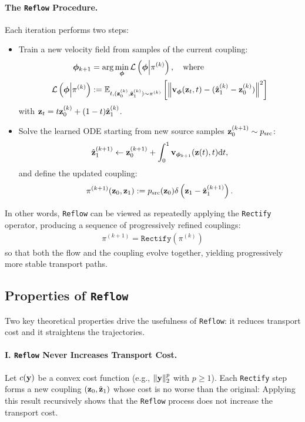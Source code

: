 \paragraph{The \texttt{Reflow} Procedure.}
Each iteration performs two steps:
\begin{itemize} 
    \item {} Train a new velocity field from samples of the current coupling: \begin{align} \bm{\phi}_{k+1} &= \arg\min_{\bm{\phi}} \mathcal{L}\left(\bm{\phi}\Big\vert \pi^{(k)}\right), \quad \text{where} \notag \\ \mathcal{L}\left(\bm{\phi}\Big\vert \pi^{(k)}\right) &:= \mathbb{E}_{t, ({\mathbf{z}}_0^{(k)}, \hat{{\mathbf{z}}}_1^{(k)})\sim \pi^{(k)}} \left[\left\|{\mathbf{v}}_{\bm{\phi}}({\mathbf{z}}_t, t) - (\hat{{\mathbf{z}}}_1^{(k)} - {\mathbf{z}}_0^{(k)})\right\|^2\right] \label{eq:reflow-loss} \end{align} with ${\mathbf{z}}_t = t {\mathbf{z}}_0^{(k)} + (1 - t) \hat{{\mathbf{z}}}_1^{(k)}$. 
    \item {} Solve the learned ODE starting from new source samples ${\mathbf{z}}_0^{(k+1)} \sim p_{\text{src}}$: \[ \hat{{\mathbf{z}}}_1^{(k+1)} \gets {\mathbf{z}}_0^{(k+1)} + \int_0^1 {\mathbf{v}}_{\bm{\phi}_{k+1}}({\mathbf{z}}(t), t) \mathrm{d}t, \] and define the updated coupling: \[ \pi^{(k+1)}({\mathbf{z}}_0, {\mathbf{z}}_1) := p_{\text{src}}({\mathbf{z}}_0) \delta\left({\mathbf{z}}_1 - \hat{{\mathbf{z}}}_1^{(k+1)}\right). \] \end{itemize}
In other words, \texttt{Reflow} can be viewed as repeatedly applying the \texttt{Rectify} operator, producing a sequence of progressively refined couplings:
\begin{align}\label{eq:rectify-op}
    \pi^{(k+1)} = \texttt{Rectify} \left(\pi^{(k)}\right)
\end{align}
so that both the flow and the coupling evolve together, yielding progressively more stable transport paths.



\subsection{Properties of \texttt{Reflow}}\label{subsec:reflow-properties}

Two key theoretical properties drive the usefulness of \texttt{Reflow}: it reduces transport cost and it straightens the trajectories.

\paragraph{I. \texttt{Reflow} Never Increases Transport Cost.}
Let $c({\mathbf{y}})$ be a convex cost function (e.g., $\|{\mathbf{y}}\|_2^p$ with $p \geq 1$). Each \texttt{Rectify} step forms a new coupling $({\mathbf{z}}_0, \hat{{\mathbf{z}}}_1)$ whose cost is no worse than the original:
Applying this result recursively shows that the \texttt{Reflow} process does not increase the transport cost.


